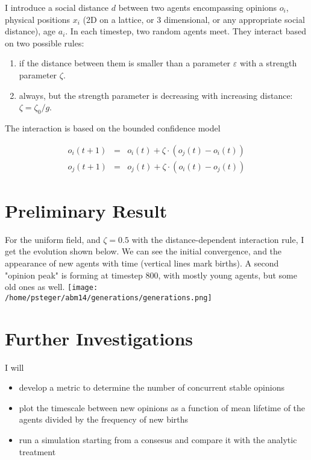 \documentclass[11pt]{article}
\begin{document}
I introduce a social distance $d$ between two agents encompassing
opinions $o_i$, physical positions $x_i$ (2D on a lattice, or 3
dimensional, or any appropriate social distance), age $a_i$. In each
timestep, two random agents meet. They interact based on two possible
rules:

\begin{enumerate}
\item if the distance between them is smaller than a parameter
   $\varepsilon$ with a strength parameter $\zeta$.

\item always, but the strength parameter is decreasing with increasing
distance: $\zeta=\zeta_0/g$.
\end{enumerate}

The interaction is based on the bounded confidence model

\begin{eqnarray}
    o_i(t+1) &=& o_i(t)+\zeta\cdot(o_j(t)-o_i(t))\\
    o_j(t+1) &=& o_j(t)+\zeta\cdot(o_i(t)-o_j(t))
\end{eqnarray}

\section{Preliminary Result}
\label{sec-4}
For the uniform field, and $\zeta=0.5$ with the distance-dependent
interaction rule, I get the evolution shown below. We can see the
initial convergence, and the appearance of new agents with time
(vertical lines mark births). A second "opinion peak" is forming at
timestep 800, with mostly young agents, but some old ones as well.
\texttt{[image: /home/psteger/abm14/generations/generations.png]}
\section{Further Investigations}
\label{sec-5}
I will
\begin{itemize}
\item develop a metric to determine the number of concurrent stable opinions
\item plot the timescale between new opinions as a function of mean lifetime of
the agents divided by the frequency of new births
\item run a simulation starting from a consesus and compare it with the analytic treatment
\end{itemize}
\end{document}
